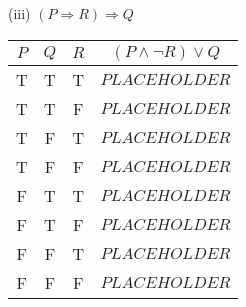 \documentclass{article}
\begin{document}
(iii) $(P \Rightarrow R) \Rightarrow Q$\\
\begin{tabular}{|c|c|c|c|}
    \hline
    $P$ & $Q$ & $R$ & $(P \land \neg R) \lor Q$ \\
    \hline
    T   & T   & T   & $PLACEHOLDER$             \\
    T   & T   & F   & $PLACEHOLDER$             \\
    T   & F   & T   & $PLACEHOLDER$             \\
    T   & F   & F   & $PLACEHOLDER$             \\
    F   & T   & T   & $PLACEHOLDER$             \\
    F   & T   & F   & $PLACEHOLDER$             \\
    F   & F   & T   & $PLACEHOLDER$             \\
    F   & F   & F   & $PLACEHOLDER$             \\
    \hline
\end{tabular}
\end{document}
